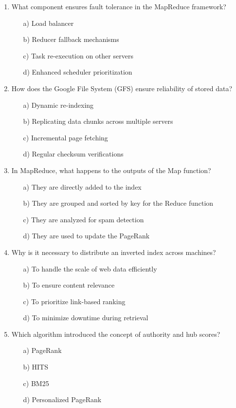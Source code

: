 \documentclass[8pt]{extarticle}
\begin{document}
\begin{multicols}{2}
\begin{enumerate}
\item What component ensures fault tolerance in the MapReduce framework?
\begin{itemize}
\item[a)] Load balancer
\item[b)] Reducer fallback mechanisms
\item[c)] Task re-execution on other servers
\item[d)] Enhanced scheduler prioritization
\end{itemize}

\item How does the Google File System (GFS) ensure reliability of stored data?
\begin{itemize}
\item[a)] Dynamic re-indexing
\item[b)] Replicating data chunks across multiple servers
\item[c)] Incremental page fetching
\item[d)] Regular checksum verifications
\end{itemize}

\item In MapReduce, what happens to the outputs of the Map function?
\begin{itemize}
\item[a)] They are directly added to the index
\item[b)] They are grouped and sorted by key for the Reduce function
\item[c)] They are analyzed for spam detection
\item[d)] They are used to update the PageRank
\end{itemize}

\item Why is it necessary to distribute an inverted index across machines?
\begin{itemize}
\item[a)] To handle the scale of web data efficiently
\item[b)] To ensure content relevance
\item[c)] To prioritize link-based ranking
\item[d)] To minimize downtime during retrieval
\end{itemize}

\item Which algorithm introduced the concept of authority and hub scores?
\begin{itemize}
\item[a)] PageRank
\item[b)] HITS
\item[c)] BM25
\item[d)] Personalized PageRank
\end{itemize}


\end{enumerate}
\end{multicols}
\end{document}
